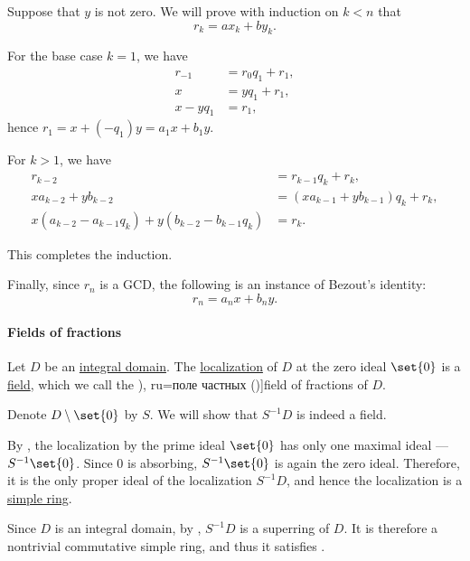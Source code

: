\begin{defproof}
  Suppose that \( y \) is not zero. We will prove with induction on \( k < n \) that
  \begin{equation*}
    r_k = a x_k + b y_k.
  \end{equation*}

  For the base case \( k = 1 \), we have
  \begin{align*}
    r_{-1}    &= r_0 q_1 + r_1, \\
    x         &= y q_1 + r_1,   \\
    x - y q_1 &= r_1,
  \end{align*}
  hence \( r_1 = x + (-q_1) y = a_1 x + b_1 y \).

  For \( k > 1 \), we have
  \begin{align*}
    r_{k-2}                                               &= r_{k-1} q_k + r_k,                 \\
    x a_{k-2} + y b_{k-2}                                 &= (x a_{k-1} + y b_{k-1}) q_k + r_k, \\
    x (a_{k-2} - a_{k-1} q_k) + y (b_{k-2} - b_{k-1} q_k) &= r_k.
  \end{align*}

  This completes the induction.

  Finally, since \( r_n \) is a GCD, the following is an instance of Bezout's identity:
  \begin{equation*}
    r_n = a_n x + b_n y.
  \end{equation*}
\end{defproof}

\paragraph{Fields of fractions}

\begin{proposition}\label{thm:field_of_fractions}
  Let \( D \) be an \hyperref[def:integral_domain]{integral domain}. The \hyperref[def:ring_localization]{localization} of \( D \) at the zero ideal \( \set{ 0 } \) is a \hyperref[def:field]{field}, which we call the \term[bg=поле от частни (\cite[def. V.16]{ГеновМиховскиМоллов1991}), ru=поле частных (\cite[26]{Шафаревич1999})]{field of fractions} of \( D \).
\end{proposition}
\begin{defproof}
  Denote \( D \setminus \set{ 0 } \) by \( S \). We will show that \( S^{-1} D \) is indeed a field.

  By , the localization by the prime ideal \( \set{ 0 } \) has only one maximal ideal --- \( S^{-1} \set{ 0 } \). Since \( 0 \) is absorbing, \( S^{-1} \set{ 0 } \) is again the zero ideal. Therefore, it is the only proper ideal of the localization \( S^{-1} D \), and hence the localization is a \hyperref[def:simple_object]{simple ring}.

  Since \( D \) is an integral domain, by , \( S^{-1} D \) is a superring of \( D \). It is therefore a nontrivial commutative simple ring, and thus it satisfies .
\end{defproof}

